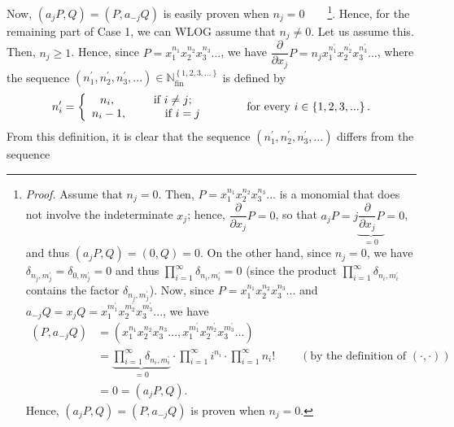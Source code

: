 \documentclass[etingof-lie.tex]{subfiles}
\begin{document}
Now, $\left(  a_{j}P,Q\right)  =\left(  P,a_{-j}Q\right)  $ is easily proven
when $n_{j}=0$\ \ \ \ \footnote{\textit{Proof.} Assume that $n_{j}=0$. Then,
$P=x_{1}^{n_{1}}x_{2}^{n_{2}}x_{3}^{n_{3}}...$ is a monomial that does not
involve the indeterminate $x_{j}$; hence, $\dfrac{\partial}{\partial x_{j}%
}P=0$, so that $a_{j}P=j\underbrace{\dfrac{\partial}{\partial x_{j}}P}_{=0}%
=0$, and thus $\left(  a_{j}P,Q\right)  =\left(  0,Q\right)  =0$. On the other
hand, since $n_{j}=0$, we have $\delta_{n_{j},m_{j}^{\prime}}=\delta
_{0,m_{j}^{\prime}}=0$ and thus $\prod\limits_{i=1}^{\infty}\delta
_{n_{i},m_{i}^{\prime}}=0$ (since the product $\prod\limits_{i=1}^{\infty
}\delta_{n_{i},m_{i}^{\prime}}$ contains the factor $\delta_{n_{j}%
,m_{j}^{\prime}}$). Now, since $P=x_{1}^{n_{1}}x_{2}^{n_{2}}x_{3}^{n_{3}}...$
and $a_{-j}Q=x_{j}Q=x_{1}^{m_{1}^{\prime}}x_{2}^{m_{2}^{\prime}}x_{3}%
^{m_{3}^{\prime}}...$, we have%
\begin{align*}
\left(  P,a_{-j}Q\right)   &  =\left(  x_{1}^{n_{1}}x_{2}^{n_{2}}x_{3}^{n_{3}%
}...,x_{1}^{m_{1}^{\prime}}x_{2}^{m_{2}^{\prime}}x_{3}^{m_{3}^{\prime}%
}...\right) \\
&  =\underbrace{\prod\limits_{i=1}^{\infty}\delta_{n_{i},m_{i}^{\prime}}}%
_{=0}\cdot\prod\limits_{i=1}^{\infty}i^{n_{i}}\cdot\prod\limits_{i=1}^{\infty
}n_{i}!\ \ \ \ \ \ \ \ \ \ \left(  \text{by the definition of }\left(
\cdot,\cdot\right)  \right) \\
&  =0=\left(  a_{j}P,Q\right)  .
\end{align*}
Hence, $\left(  a_{j}P,Q\right)  =\left(  P,a_{-j}Q\right)  $ is proven when
$n_{j}=0$.}. Hence, for the remaining part of Case 1, we can WLOG assume that
$n_{j}\neq0$. Let us assume this. Then, $n_{j}\geq1$. Hence, since
$P=x_{1}^{n_{1}}x_{2}^{n_{2}}x_{3}^{n_{3}}...$, we have $\dfrac{\partial
}{\partial x_{j}}P=n_{j}x_{1}^{n_{1}^{\prime}}x_{2}^{n_{2}^{\prime}}%
x_{3}^{n_{3}^{\prime}}...$, where the sequence $\left(  n_{1}^{\prime}%
,n_{2}^{\prime},n_{3}^{\prime},...\right)  \in\mathbb{N}_{\operatorname*{fin}%
}^{\left\{  1,2,3,...\right\}  }$ is defined by%
\[
n_{i}^{\prime}=\left\{
\begin{array}
[c]{c}%
n_{i},\ \ \ \ \ \ \ \ \ \ \text{if }i\neq j;\\
n_{i}-1,\ \ \ \ \ \ \ \ \ \ \text{if }i=j
\end{array}
\right.  \ \ \ \ \ \ \ \ \ \ \text{for every }i\in\left\{  1,2,3,...\right\}
.
\]
From this definition, it is clear that the sequence $\left(  n_{1}^{\prime
},n_{2}^{\prime},n_{3}^{\prime},...\right)  $ differs from the sequence
\end{document}
